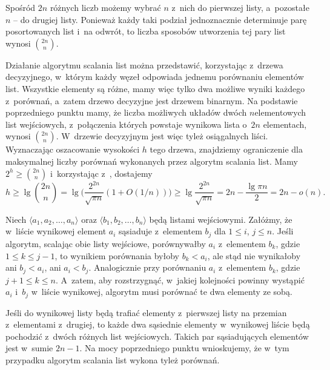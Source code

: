 
\subproblem %
Spośród $2n$ różnych liczb możemy wybrać $n$ z~nich do pierwszej listy, a~pozostałe $n$ -- do drugiej listy.
Ponieważ każdy taki podział jednoznacznie determinuje parę posortowanych list i~na odwrót, to liczba sposobów utworzenia tej pary list wynosi $\binom{2n}{n}$.

\subproblem %
Działanie algorytmu scalania list można przedstawić, korzystając z~drzewa decyzyjnego, w~którym każdy węzeł odpowiada jednemu porównaniu elementów list.
Wszystkie elementy są różne, mamy więc tylko dwa możliwe wyniki każdego z~porównań, a~zatem drzewo decyzyjne jest drzewem binarnym.
Na podstawie poprzedniego punktu mamy, że liczba możliwych układów dwóch $n$\nbhyphen elementowych list wejściowych, z~połączenia których powstaje wynikowa lista o~$2n$ elementach, wynosi $\binom{2n}{n}$.
W~drzewie decyzyjnym jest więc tyleż osiągalnych liści.
Wyznaczając oszacowanie wysokości $h$ tego drzewa, znajdziemy ograniczenie dla maksymalnej liczby porównań wykonanych przez algorytm scalania list.
Mamy $2^h\ge\binom{2n}{n}$ i~korzystając z~, dostajemy
\[
    h \ge \lg\binom{2n}{n} = \lg\biggl(\frac{2^{2n}}{\sqrt{\pi n}}(1+O(1/n))\biggr) \ge \lg\frac{2^{2n}}{\sqrt{\pi n}} = 2n-\frac{\lg\pi n}{2} = 2n-o(n).
\]

\subproblem %
Niech $\langle a_1,a_2,\dots,a_n\rangle$ oraz $\langle b_1,b_2,\dots,b_n\rangle$ będą listami wejściowymi.
Załóżmy, że w~liście wynikowej element $a_i$ sąsiaduje z~elementem $b_j$ dla $1\le i$, $j\le n$.
Jeśli algorytm, scalając obie listy wejściowe, porównywałby $a_i$ z~elementem $b_k$, gdzie $1\le k\le j-1$, to wynikiem porównania byłoby $b_k<a_i$, ale stąd nie wynikałoby ani $b_j<a_i$, ani $a_i<b_j$.
Analogicznie przy porównaniu $a_i$ z~elementem $b_k$, gdzie $j+1\le k\le n$.
A~zatem, aby rozstrzygnąć, w~jakiej kolejności powinny wystąpić $a_i$ i~$b_j$ w~liście wynikowej, algorytm musi porównać te dwa elementy ze sobą.

\subproblem %
Jeśli do wynikowej listy będą trafiać elementy z~pierwszej listy na przemian z~elementami z~drugiej, to każde dwa sąsiednie elementy w~wynikowej liście będą pochodzić z~dwóch różnych list wejściowych.
Takich par sąsiadujących elementów jest w~sumie $2n-1$.
Na mocy poprzedniego punktu wnioskujemy, że w~tym przypadku algorytm scalania list wykona tyleż porównań.
